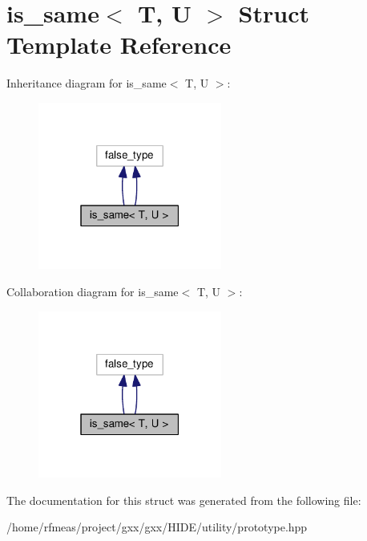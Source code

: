 \hypertarget{structis__same}{}\section{is\+\_\+same$<$ T, U $>$ Struct Template Reference}
\label{structis__same}


Inheritance diagram for is\+\_\+same$<$ T, U $>$\+:
\nopagebreak
\begin{figure}[H]
\begin{center}
\leavevmode
\includegraphics[width=171pt]{structis__same__inherit__graph}
\end{center}
\end{figure}


Collaboration diagram for is\+\_\+same$<$ T, U $>$\+:
\nopagebreak
\begin{figure}[H]
\begin{center}
\leavevmode
\includegraphics[width=171pt]{structis__same__coll__graph}
\end{center}
\end{figure}


The documentation for this struct was generated from the following file\+:\begin{DoxyCompactItemize}
\item 
/home/rfmeas/project/gxx/gxx/\+H\+I\+D\+E/utility/prototype.\+hpp\end{DoxyCompactItemize}
